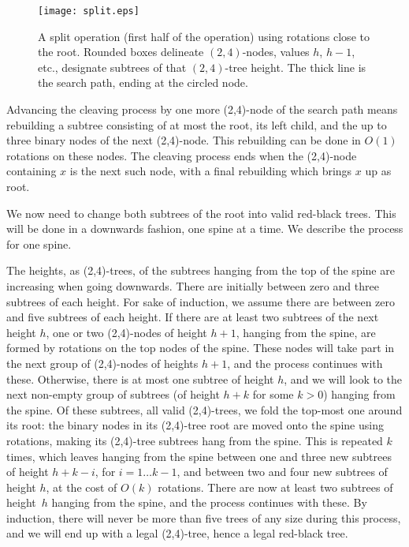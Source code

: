 \documentclass[letterpaper,11pt]{article}
\begin{document}
\begin{figure}\begin{center}
        \texttt{[image: split.eps]}
    \end{center}
    \caption{\label{fig-split-from-root} A split operation (first half of
    the operation) using rotations close to the root. Rounded boxes
    delineate $(2,4)$-nodes, values $h$, $h-1$, etc., designate subtrees of
    that $(2,4)$-tree height. The thick line is the search path, ending at
    the circled node.}
\end{figure}

Advancing the cleaving process by one more (2,4)-node of the search path
means rebuilding a subtree consisting of at most the root, its left child,
and the up to three binary nodes of the next (2,4)-node. This rebuilding
can be done in $O(1)$ rotations on these nodes. The cleaving process ends
when the (2,4)-node containing $x$ is the next such node, with a final
rebuilding which brings $x$ up as root.

We now need to change both subtrees of the root into valid red-black
trees. This will be done in a downwards fashion, one spine at a time. We
describe the process for one spine.

The heights, as (2,4)-trees, of the subtrees hanging from the top of the
spine are increasing when going downwards. There are initially between zero
and three subtrees of each height. For sake of induction, we assume there
are between zero and five subtrees of each height. If there are at least
two subtrees of the next height $h$, one or two (2,4)-nodes of height
$h+1$, hanging from the spine, are formed by rotations on the top nodes of
the spine. These nodes will take part in the next group of (2,4)-nodes of
heights $h+1$, and the process continues with these. Otherwise, there is at
most one subtree of height $h$, and we will look to the next non-empty
group of subtrees (of height $h+k$ for some $k>0$) hanging from the
spine. Of these subtrees, all valid (2,4)-trees, we fold the top-most one
around its root: the binary nodes in its (2,4)-tree root are moved onto the
spine using rotations, making its (2,4)-tree subtrees hang from the
spine. This is repeated $k$ times, which leaves hanging from the spine
between one and three new subtrees of height $h+k-i$, for $i = 1 \dots
k-1$, and between two and four new subtrees of height $h$, at the cost of
$O(k)$ rotations. There are now at least two subtrees of height~$h$ hanging
from the spine, and the process continues with these. By induction, there
will never be more than five trees of any size during this process, and we
will end up with a legal (2,4)-tree, hence a legal red-black tree.
\end{document}
